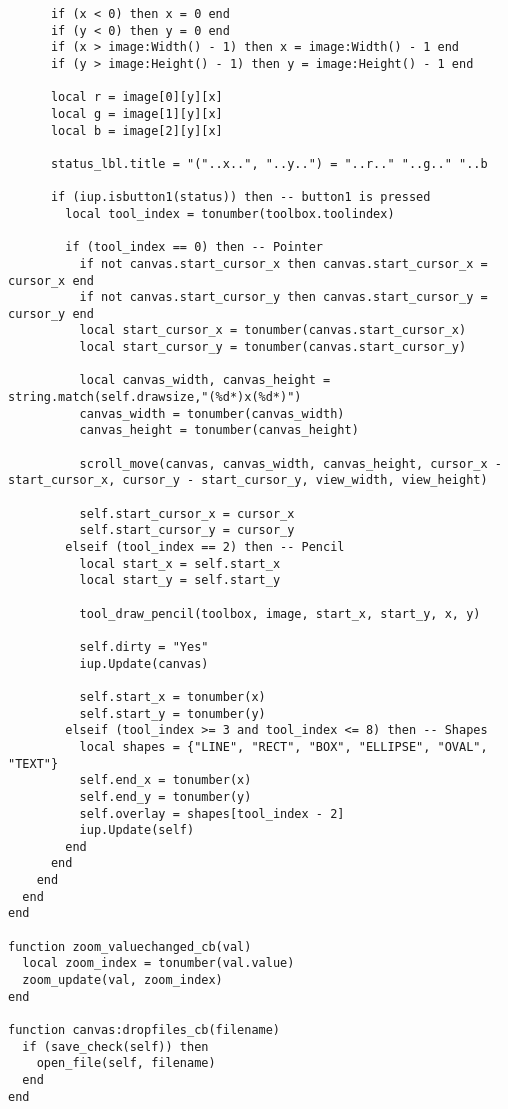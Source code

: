 \documentclass{ctexart}
\begin{document}
\begin{lstlisting}
      if (x < 0) then x = 0 end
      if (y < 0) then y = 0 end
      if (x > image:Width() - 1) then x = image:Width() - 1 end
      if (y > image:Height() - 1) then y = image:Height() - 1 end

      local r = image[0][y][x]
      local g = image[1][y][x]
      local b = image[2][y][x]
      
      status_lbl.title = "("..x..", "..y..") = "..r.." "..g.." "..b

      if (iup.isbutton1(status)) then -- button1 is pressed
        local tool_index = tonumber(toolbox.toolindex)
        
        if (tool_index == 0) then -- Pointer 
          if not canvas.start_cursor_x then canvas.start_cursor_x = cursor_x end
          if not canvas.start_cursor_y then canvas.start_cursor_y = cursor_y end
          local start_cursor_x = tonumber(canvas.start_cursor_x)
          local start_cursor_y = tonumber(canvas.start_cursor_y)

          local canvas_width, canvas_height = string.match(self.drawsize,"(%d*)x(%d*)")
          canvas_width = tonumber(canvas_width)
          canvas_height = tonumber(canvas_height)

          scroll_move(canvas, canvas_width, canvas_height, cursor_x - start_cursor_x, cursor_y - start_cursor_y, view_width, view_height)

          self.start_cursor_x = cursor_x
          self.start_cursor_y = cursor_y
        elseif (tool_index == 2) then -- Pencil
          local start_x = self.start_x
          local start_y = self.start_y
          
          tool_draw_pencil(toolbox, image, start_x, start_y, x, y)

          self.dirty = "Yes"
          iup.Update(canvas)

          self.start_x = tonumber(x)
          self.start_y = tonumber(y)          
        elseif (tool_index >= 3 and tool_index <= 8) then -- Shapes
          local shapes = {"LINE", "RECT", "BOX", "ELLIPSE", "OVAL", "TEXT"}
          self.end_x = tonumber(x)
          self.end_y = tonumber(y)
          self.overlay = shapes[tool_index - 2]
          iup.Update(self)
        end
      end
    end
  end
end

function zoom_valuechanged_cb(val)
  local zoom_index = tonumber(val.value)
  zoom_update(val, zoom_index)
end

function canvas:dropfiles_cb(filename)
  if (save_check(self)) then
    open_file(self, filename)
  end
end


\end{lstlisting}
\end{document}
